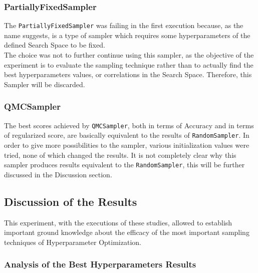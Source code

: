 \subsubsection{PartiallyFixedSampler}

The \texttt{PartiallyFixedSampler} was failing in the first execution because, as the name suggests, is a type of sampler which requires some hyperparameters of the defined Search Space to be fixed.
\\[0.3cm]The choice was not to further continue using this sampler, as the objective of the experiment is to evaluate the sampling technique rather than to actually find the best hyperparameters values, or correlations in the Search Space.
Therefore, this Sampler will be discarded.

\subsubsection{QMCSampler}

The best scores achieved by \texttt{QMCSampler}, both in terms of Accuracy and in terms of regularized score, are basically equivalent to the results of \texttt{RandomSampler}.
In order to give more possibilities to the sampler, various initialization values were tried, none of which changed the results.
It is not completely clear why this sampler produces results equivalent to the \texttt{RandomSampler}, this will be further discussed in the Discussion section.

\subsection{Discussion of the Results}

This experiment, with the executions of these studies, allowed to establish important ground knowledge about the efficacy of the most important sampling techniques of Hyperparameter Optimization.

\subsubsection{Analysis of the Best Hyperparameters Results}

